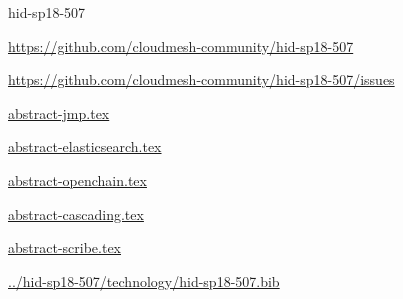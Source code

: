 \begin{IU}

hid-sp18-507

\url{https://github.com/cloudmesh-community/hid-sp18-507}

\url{https://github.com/cloudmesh-community/hid-sp18-507/issues}

\href{https://github.com/cloudmesh-community/hid-sp18-507/blob/master//technology/abstract-jmp.tex}{abstract-jmp.tex}

\href{https://github.com/cloudmesh-community/hid-sp18-507/blob/master//technology/abstract-elasticsearch.tex}{abstract-elasticsearch.tex}

\href{https://github.com/cloudmesh-community/hid-sp18-507/blob/master//technology/abstract-openchain.tex}{abstract-openchain.tex}

\href{https://github.com/cloudmesh-community/hid-sp18-507/blob/master//technology/abstract-cascading.tex}{abstract-cascading.tex}

\href{https://github.com/cloudmesh-community/hid-sp18-507/blob/master//technology/abstract-scribe.tex}{abstract-scribe.tex}

\href{https://github.com/cloudmesh-community/hid-sp18-507/blob/master//technology/hid-sp18-507.bib}{../hid-sp18-507/technology/hid-sp18-507.bib}

\end{IU}



